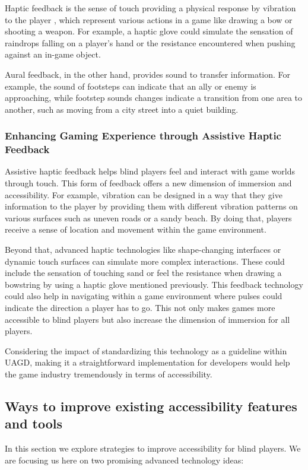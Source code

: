 \documentclass[sigconf,natbib=false,10pt]{acmart}
\begin{document}
	Haptic feedback is the sense of touch providing a physical response by vibration to the player \cite{chen_gamepad_2024, kuber_towards_2007, bello_haptics_2016}, which represent various actions in a game like drawing a bow or shooting a weapon.
	For example, a haptic glove could simulate the sensation of raindrops falling on a player's hand or the resistance encountered when pushing against an in-game object.
	
	Aural feedback, in the other hand, provides sound to transfer information.
	For example, the sound of footsteps can indicate that an ally or enemy is approaching, while footstep sounds changes indicate a transition from one area to another, such as moving from a city street into a quiet building.
	
	\subsubsection{Enhancing Gaming Experience through Assistive Haptic Feedback}
	Assistive haptic feedback helps blind players feel and interact with game worlds through touch.
	This form of feedback offers a new dimension of immersion and accessibility.
	For example, vibration can be designed in a way that they give information to the player by providing them with different vibration patterns on various surfaces such as uneven roads or a sandy beach.
	By doing that, players receive a sense of location and movement within the game environment.
	
	Beyond that, advanced haptic technologies like shape-changing interfaces or dynamic touch surfaces \cite{rasmussen_shape-changing_2012} can simulate more complex interactions.
	These could include the sensation of touching sand or feel the resistance when drawing a bowstring by using a haptic glove mentioned previously.
	This feedback technology could also help in navigating within a game environment where pulses could indicate the direction a player has to go.
	This not only makes games more accessible to blind players but also increase the dimension of immersion for all players.
	
	Considering the impact of standardizing this technology as a guideline within UAGD, making it a straightforward implementation for developers would help the game industry tremendously in terms of accessibility.
	
	\subsection{Ways to improve existing accessibility features and tools} \label{subsec:improvements}
	In this section we explore strategies to improve accessibility for blind players.
	We are focusing us here on two promising advanced technology ideas:
	
\end{document}
